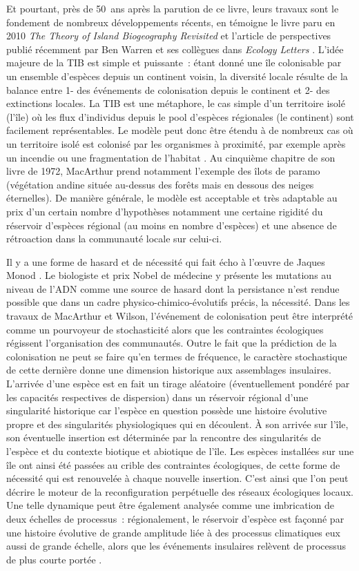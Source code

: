Et pourtant, près de 50~ans après la parution de ce livre, leurs travaux
sont le fondement de nombreux développements récents, en témoigne le
livre paru en 2010 \emph{The Theory of Island Biogeography Revisited}
\citep{Losos2010} et l'article de perspectives publié récemment par Ben
Warren et ses collègues dans \emph{Ecology Letters} \citep{Warren2015}.
L'idée majeure de la TIB est simple et puissante~: étant donné une île
colonisable par un ensemble d'espèces depuis un continent voisin, la
diversité locale résulte de la balance entre 1- des événements de
colonisation depuis le continent et 2- des extinctions locales. La TIB
est une métaphore, le cas simple d'un territoire isolé (l'île) où les
flux d'individus depuis le pool d'espèces régionales (le continent) sont
facilement représentables. Le modèle peut donc être étendu à de nombreux
cas où un territoire isolé est colonisé par les organismes à proximité,
par exemple après un incendie ou une fragmentation de l'habitat
\citep{Cook2002}. Au cinquième chapitre de son livre de 1972, MacArthur
prend notamment l'exemple des îlots de paramo (végétation andine située
au-dessus des forêts mais en dessous des neiges éternelles). De manière
générale, le modèle est acceptable et très adaptable au prix d'un
certain nombre d'hypothèses notamment une certaine rigidité du réservoir
d'espèces régional (au moins en nombre d'espèces) et une absence de
rétroaction dans la communauté locale sur celui-ci.

Il y a une forme de hasard et de nécessité qui fait écho à l'œuvre de
Jaques Monod \citep{monod1970hasard}. Le biologiste et prix Nobel de
médecine y présente les mutations au niveau de l'ADN comme une source de
hasard dont la persistance n'est rendue possible que dans un cadre
physico-chimico-évolutifs précis, la nécessité. Dans les travaux de
MacArthur et Wilson, l'événement de colonisation peut être interprété
comme un pourvoyeur de stochasticité alors que les contraintes
écologiques régissent l'organisation des communautés. Outre le fait que
la prédiction de la colonisation ne peut se faire qu'en termes de
fréquence, le caractère stochastique de cette dernière donne une
dimension historique aux assemblages insulaires. L'arrivée d'une espèce
est en fait un tirage aléatoire (éventuellement pondéré par les
capacités respectives de dispersion) dans un réservoir régional d'une
singularité historique car l'espèce en question possède une histoire
évolutive propre et des singularités physiologiques qui en découlent. À
son arrivée sur l'île, son éventuelle insertion est déterminée par la
rencontre des singularités de l'espèce et du contexte biotique et
abiotique de l'île. Les espèces installées sur une île ont ainsi été
passées au crible des contraintes écologiques, de cette forme de
nécessité qui est renouvelée à chaque nouvelle insertion. C'est ainsi
que l'on peut décrire le moteur de la reconfiguration perpétuelle des
réseaux écologiques locaux. Une telle dynamique peut être également
analysée comme une imbrication de deux échelles de processus~:
régionalement, le réservoir d'espèce est façonné par une histoire
évolutive de grande amplitude liée à des processus climatiques eux aussi
de grande échelle, alors que les événements insulaires relèvent de
processus de plus courte portée \citep{Ricklefs1987}.

